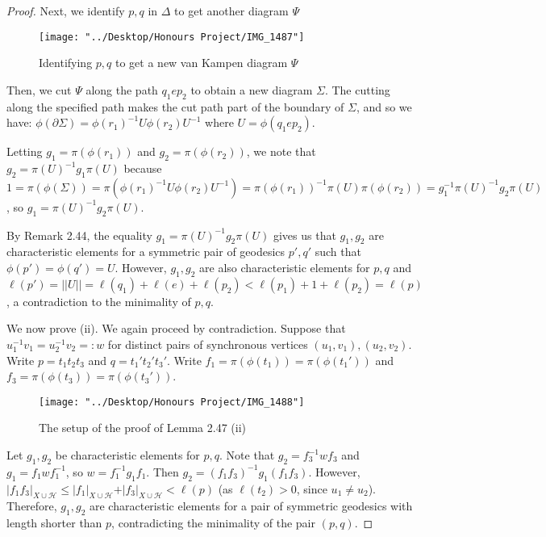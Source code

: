\documentclass[12pt]{article}
\newcommand{\vs}{\vskip10pt}
\begin{document}
\begin{proof}
		Next, we identify $p,q$ in $\Delta$ to get another diagram $\Psi$
		
		
\begin{figure} [H]
	\centering
	\texttt{[image: "../Desktop/Honours Project/IMG\_1487"]}
	\caption{Identifying $p,q$ to get a new van Kampen diagram $\Psi$}
	\label{fig:img1487}
\end{figure}
		
		\vs 
		
		Then, we cut $\Psi$ along the path $q_1 e p_2$ to obtain a new diagram $\Sigma$. The cutting along the specified path makes the cut path part of the boundary of $\Sigma$, and so we have: $\phi(\partial \Sigma) = \phi(r_1)^{-1} U \phi(r_2) U^{-1}$ where $U = \phi(q_1 e p_2)$. 
		
		\vs 
		
		Letting $g_1 = \pi(\phi(r_1))$ and $g_2 = \pi(\phi(r_2))$, we note that $g_2 = \pi(U)^{-1} g_1 \pi(U)$ because $1 = \pi(\phi(\Sigma)) = \pi(\phi(r_1)^{-1} U \phi(r_2) U^{-1}) = \pi(\phi(r_1))^{-1} \pi(U) \pi(\phi(r_2)) = g_1^{-1} \pi(U)^{-1} g_2 \pi(U)$, so $g_1 = \pi(U)^{-1} g_2 \pi(U)$. 
		
		\vs 
		
		By Remark 2.44, the equality $g_1 = \pi(U)^{-1} g_2 \pi(U)$ gives us that $g_1, g_2$ are characteristic elements for a symmetric pair of geodesics $p', q'$ such that $\phi(p') = \phi(q') = U$. However, $g_1, g_2$ are also characteristic elements for $p,q$ and $\ell(p') = \vert \vert U \vert \vert = \ell(q_1) + \ell(e) + \ell(p_2) < \ell(p_1) + 1 + \ell(p_2) = \ell(p)$, a contradiction to the minimality of $p,q$. 
		
		\vs 
		
		We now prove (ii). We again proceed by contradiction. Suppose that $u_1^{-1} v_1 = u_2^{-1} v_2 =: w$ for distinct pairs of synchronous vertices $(u_1, v_1), (u_2, v_2)$. Write $p = t_1 t_2 t_3$ and $q = t_1' t_2' t_3'$. Write $f_1 = \pi(\phi(t_1)) = \pi(\phi(t_1'))$ and $f_3 = \pi(\phi(t_3)) = \pi(\phi(t_3'))$. 
		
\begin{figure} [H]
	\centering
	\texttt{[image: "../Desktop/Honours Project/IMG\_1488"]}
	\caption{The setup of the proof of Lemma 2.47 (ii)}
	\label{fig:img1488}
\end{figure}

		\vs 
		
		Let $g_1, g_2$ be characteristic elements for $p,q$. Note that $g_2  = f_3^{-1} w f_3$ and $g_1 = f_1 w f_1^{-1}$, so $w = f_1^{-1} g_1 f_1$. Then $g_2 = (f_1 f_3)^{-1} g_1 (f_1 f_3)$. However, $\vert f_1 f_3 \vert_{X \cup \mathcal{H}} \leq \vert f_1 \vert_{X \cup \mathcal{H}} + \vert f_3 \vert_{X \cup \mathcal{H}} < \ell(p)$ (as $\ell(t_2) > 0$, since $u_1 \neq u_2$). Therefore, $g_1, g_2$ are characteristic elements for a pair of symmetric geodesics with length shorter than $p$, contradicting the minimality of the pair $(p,q)$.   
		
	\end{proof}
	
\end{document}
